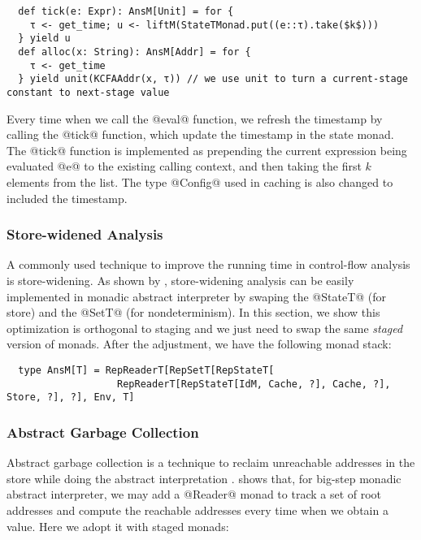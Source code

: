 \begin{lstlisting}
  def tick(e: Expr): AnsM[Unit] = for {
    τ <- get_time; u <- liftM(StateTMonad.put((e::τ).take($k$)))
  } yield u
  def alloc(x: String): AnsM[Addr] = for {
    τ <- get_time
  } yield unit(KCFAAddr(x, τ)) // we use unit to turn a current-stage constant to next-stage value
\end{lstlisting}

Every time when we call the @eval@ function, we refresh the timestamp by calling
the @tick@ function, which update the timestamp in the state monad. The @tick@
function is implemented as prepending the current expression being evaluated @e@
to the existing calling context, and then taking the first $k$ elements from the list.
The type @Config@ used in caching is also changed to included the timestamp.

\subsubsection{Store-widened Analysis}

A commonly used technique to improve the running time in control-flow analysis
is store-widening. As shown by \cite{Darais:2015:GTM:2814270.2814308,
DBLP:journals/pacmpl/DaraisLNH17}, store-widening analysis can be easily
implemented in monadic abstract interpreter by swaping the @StateT@ (for store)
and the @SetT@ (for nondeterminism). In this section, we show this optimization
is orthogonal to staging and we just need to swap the same \textit{staged}
version of monads. After the adjustment, we have the following monad stack:

\begin{lstlisting}
  type AnsM[T] = RepReaderT[RepSetT[RepStateT[
                   RepReaderT[RepStateT[IdM, Cache, ?], Cache, ?], Store, ?], ?], Env, T]
\end{lstlisting}

\subsubsection{Abstract Garbage Collection}

Abstract garbage collection is a technique to reclaim unreachable addresses in
the store while doing the abstract interpretation
\cite{Might:2006:IFA:1159803.1159807}. \citet{DBLP:journals/pacmpl/DaraisLNH17}
shows that, for big-step monadic abstract interpreter, we may add a @Reader@
monad to track a set of root addresses and compute the reachable addresses every
time when we obtain a value. Here we adopt it with staged monads:

